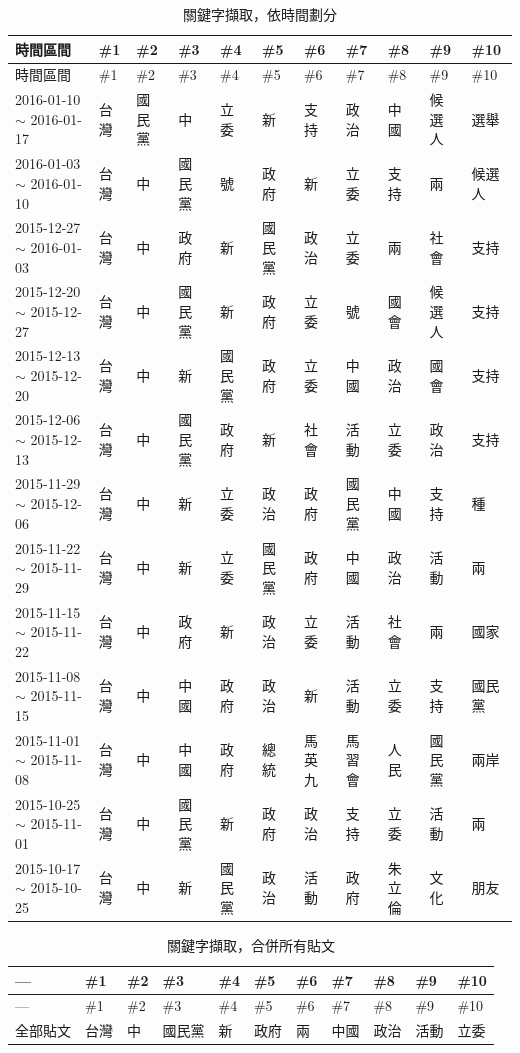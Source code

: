 \documentclass[letterpaper, 10pt, conference]{ieeeconf}   %
\begin{document}
\begin{CJK}{UTF8}{bsmi}
\begin{longtable}[c]{@{}L{2.45cm}L{1.1cm}L{1.1cm}L{1.1cm}L{1.1cm}L{1.1cm}L{1.1cm}L{1.1cm}L{1.1cm}L{1.1cm}L{1.1cm}@{}}
\caption{關鍵字擷取，依時間劃分}
\label{t3}\\
\toprule
時間區間 & \#1 & \#2 & \#3 & \#4 & \#5 & \#6 & \#7 & \#8 & \#9 & \#10 \\* \midrule
\endfirsthead
\toprule
時間區間 & \#1 & \#2 & \#3 & \#4 & \#5 & \#6 & \#7 & \#8 & \#9 & \#10 \\* \midrule
\endhead
%
\bottomrule
\endfoot
%
\endlastfoot
%
2016-01-10 $\sim$ 2016-01-17 & 台灣 & 國民黨 & 中 & 立委 & 新 & 支持 & 政治 & 中國 & 候選人 & 選舉 \\
2016-01-03 $\sim$ 2016-01-10 & 台灣 & 中 & 國民黨 & 號 & 政府 & 新 & 立委 & 支持 & 兩 & 候選人 \\
2015-12-27 $\sim$ 2016-01-03 & 台灣 & 中 & 政府 & 新 & 國民黨 & 政治 & 立委 & 兩 & 社會 & 支持 \\
2015-12-20 $\sim$ 2015-12-27 & 台灣 & 中 & 國民黨 & 新 & 政府 & 立委 & 號 & 國會 & 候選人 & 支持 \\
2015-12-13 $\sim$ 2015-12-20 & 台灣 & 中 & 新 & 國民黨 & 政府 & 立委 & 中國 & 政治 & 國會 & 支持 \\
2015-12-06 $\sim$ 2015-12-13 & 台灣 & 中 & 國民黨 & 政府 & 新 & 社會 & 活動 & 立委 & 政治 & 支持 \\
2015-11-29 $\sim$ 2015-12-06 & 台灣 & 中 & 新 & 立委 & 政治 & 政府 & 國民黨 & 中國 & 支持 & 種 \\
2015-11-22 $\sim$ 2015-11-29 & 台灣 & 中 & 新 & 立委 & 國民黨 & 政府 & 中國 & 政治 & 活動 & 兩 \\
2015-11-15 $\sim$ 2015-11-22 & 台灣 & 中 & 政府 & 新 & 政治 & 立委 & 活動 & 社會 & 兩 & 國家 \\
2015-11-08 $\sim$ 2015-11-15 & 台灣 & 中 & 中國 & 政府 & 政治 & 新 & 活動 & 立委 & 支持 & 國民黨 \\
2015-11-01 $\sim$ 2015-11-08 & 台灣 & 中 & 中國 & 政府 & 總統 & 馬英九 & 馬習會 & 人民 & 國民黨 & 兩岸 \\
2015-10-25 $\sim$ 2015-11-01 & 台灣 & 中 & 國民黨 & 新 & 政府 & 政治 & 支持 & 立委 & 活動 & 兩 \\
2015-10-17 $\sim$ 2015-10-25 & 台灣 & 中 & 新 & 國民黨 & 政治 & 活動 & 政府 & 朱立倫 & 文化 & 朋友 \\* \bottomrule
\end{longtable}

\begin{longtable}[c]{@{}L{2.45cm}L{1.1cm}L{1.1cm}L{1.1cm}L{1.1cm}L{1.1cm}L{1.1cm}L{1.1cm}L{1.1cm}L{1.1cm}L{1.1cm}@{}}
\caption{關鍵字擷取，合併所有貼文}
\label{t4}\\
\toprule
--- & \#1 & \#2 & \#3 & \#4 & \#5 & \#6 & \#7 & \#8 & \#9 & \#10 \\* \midrule
\endfirsthead
\toprule
--- & \#1 & \#2 & \#3 & \#4 & \#5 & \#6 & \#7 & \#8 & \#9 & \#10 \\* \midrule
\endhead
%
\bottomrule
\endfoot
%
\endlastfoot
%
全部貼文 & 台灣 & 中 & 國民黨 & 新 & 政府 & 兩 & 中國 & 政治 & 活動 & 立委 \\* \bottomrule
\end{longtable}


\end{CJK}
\end{document}
